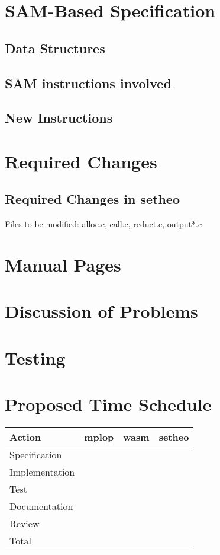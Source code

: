 \begin{description}
\section{SAM-Based Specification}
\subsection{Data Structures}
\subsection{SAM instructions involved}
\subsection{New Instructions}
\section{Required Changes}
\subsection{Required Changes in setheo}
Files to be modified:
alloc.c, call.c, reduct.c, output*.c

\section{Manual Pages}

\section{Discussion of Problems}
\section{Testing}
\section{Proposed Time Schedule}

\begin{center}
\begin{tabular}{|l|r|r|r|}
\hline\hline
Action & mplop & wasm & setheo \\
\hline
Specification & & & \\
Implementation & & & \\
Test & & & \\
Documentation & & & \\
Review & & & \\
\hline
Total & & & \\
\hline\hline
\end{tabular}
\end{center}



\end{description}
